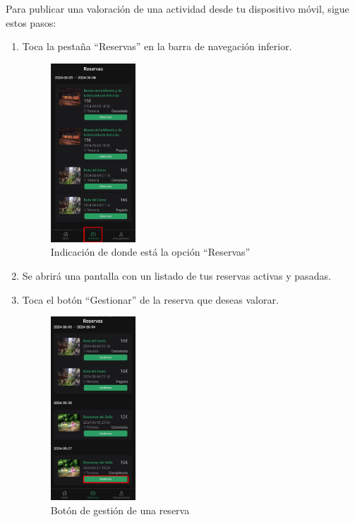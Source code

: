 Para publicar una valoración de una actividad desde tu dispositivo móvil, sigue estos pasos:
\begin{enumerate}
	\item Toca la pestaña “Reservas” en la barra de navegación inferior.
	      \begin{figure}[H]
		      \centering
		      \includegraphics[width=0.3\textwidth]{7-Construccion/Manuales/app/P1-GestionReserva.png}
		      \caption{Indicación de donde está la opción “Reservas” }
	      \end{figure}
	\item Se abrirá una pantalla con un listado de tus reservas activas y pasadas.
	\item Toca el botón “Gestionar” de la reserva que deseas valorar.
	      \begin{figure}[H]
		      \centering
		      \includegraphics[width=0.3\textwidth]{7-Construccion/Manuales/app/P0-Publicar.png}
		      \caption{Botón de gestión de una reserva}

\end{figure}
\end{enumerate}
